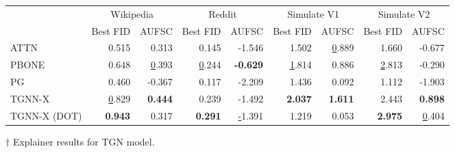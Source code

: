 \begin{tabular}{lrrrrrrrr}
\toprule
 & \multicolumn{2}{c}{Wikipedia} & \multicolumn{2}{c}{Reddit} & \multicolumn{2}{c}{Simulate V1} & \multicolumn{2}{c}{Simulate V2} \\
 & Best FID & AUFSC & Best FID & AUFSC & Best FID & AUFSC & Best FID & AUFSC \\
\midrule
ATTN & 0.515 & 0.313 & 0.145 & -1.546 & 1.502 & \underline 0.889 & 1.660 & -0.677 \\
PBONE & 0.648 & \underline 0.393 & \underline 0.244 & \bfseries -0.629 & \underline 1.814 & 0.886 & \underline 2.813 & -0.290 \\
PG & 0.460 & -0.367 & 0.117 & -2.209 & 1.436 & 0.092 & 1.112 & -1.903 \\
TGNN-X & \underline 0.829 & \bfseries 0.444 & 0.239 & -1.492 & \bfseries 2.037 & \bfseries 1.611 & 2.443 & \bfseries 0.898 \\
TGNN-X (DOT) & \bfseries 0.943 & 0.317 & \bfseries 0.291 & \underline -1.391 & 1.219 & 0.053 & \bfseries 2.975 & \underline 0.404 \\
\bottomrule
\end{tabular}
\caption{\label{tab:tgn_results}$\dagger$ Explainer results for TGN model.}
